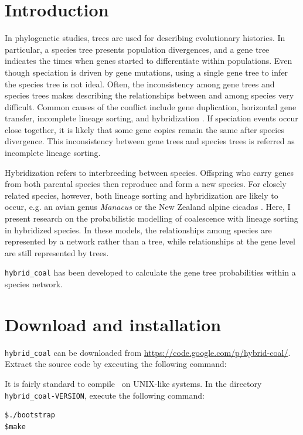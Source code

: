

\section{Introduction}

In phylogenetic studies, trees are used for describing evolutionary histories. In particular, a species tree presents population divergences, and a gene tree indicates the times when genes started to differentiate within populations. Even though speciation is driven by gene mutations, using a single gene tree to infer the species tree is 
not ideal. Often, the inconsistency among gene trees and species trees makes describing the relationships between and among species very difficult. Common causes of the conflict include gene duplication, horizontal gene transfer, incomplete lineage sorting, and hybridization \citep{Holland2008,Meng2009}. If speciation events occur close together, it is likely that some gene copies remain the same after species divergence. This inconsistency between gene trees and species trees is referred as incomplete lineage sorting. 

Hybridization refers to interbreeding between species. Offspring who carry genes from both parental species then reproduce and form a new species. 
For closely related species, however, both lineage sorting and hybridization are likely to occur, e.g. an avian genus {\it Manacus} \citep{Brumfield2010} or the New Zealand alpine cicadas \citep{Buckley2006}. Here, I present research on the probabilistic modelling of coalescence with lineage sorting in hybridized species. In these models, the relationships among species are represented by a network rather than a tree, while relationships at the gene level are still represented by trees. 

{\tt hybrid\_coal} has been developed to calculate the gene tree probabilities within a species network.

\section{Download and installation}
{\tt hybrid\_coal} can be downloaded from \url{https://code.google.com/p/hybrid-coal/}. Extract the source code by executing the following command:

It is fairly standard to compile \hs~on UNIX-like systems. In the directory {\tt hybrid\_coal-VERSION}, execute the following command:
\begin{verbatim}
$./bootstrap
$make
\end{verbatim}

